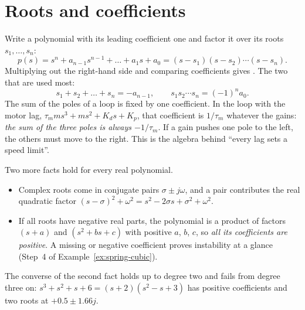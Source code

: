 \label{app:routh}


\section{Roots and coefficients}

Write a polynomial with its leading coefficient one and factor it over its roots $s_1, \dots, s_n$:
\begin{equation}
  p(s) = s^n + a_{n-1}s^{n-1} + \dots + a_1 s + a_0 = (s - s_1)(s - s_2)\cdots(s - s_n) .
\end{equation}
Multiplying out the right-hand side and comparing coefficients gives . The two that are used most:
\begin{equation}\label{eq:B-vieta}
  s_1 + s_2 + \dots + s_n = -a_{n-1}, \qquad s_1 s_2 \cdots s_n = (-1)^n a_0 .
\end{equation}
The sum of the poles of a loop is fixed by one coefficient. In the loop with the motor lag, $\tau_m m s^3 + m s^2 + K_ds + K_p$, that coefficient is $1/\tau_m$ whatever the gains: \emph{the sum of the three poles is always $-1/\tau_m$}. If a gain pushes one pole to the left, the others must move to the right. This is the algebra behind \enquote{every lag sets a speed limit}.

Two more facts hold for every real polynomial.
\begin{itemize}
  \item Complex roots come in conjugate pairs $\sigma \pm j\omega$, and a pair contributes the real quadratic factor $(s - \sigma)^2 + \omega^2 = s^2 - 2\sigma s + \sigma^2 + \omega^2$.
  \item If all roots have negative real parts, the polynomial is a product of factors $(s + a)$ and $(s^2 + bs + c)$ with positive $a$, $b$, $c$, so \emph{all its coefficients are positive}. A missing or negative coefficient proves instability at a glance (Step~4 of Example~\ref{ex:spring-cubic}).
\end{itemize}
The converse of the second fact holds up to degree two and fails from degree three on: $s^3 + s^2 + s + 6 = (s + 2)(s^2 - s + 3)$ has positive coefficients and two roots at $+0.5 \pm 1.66j$.

